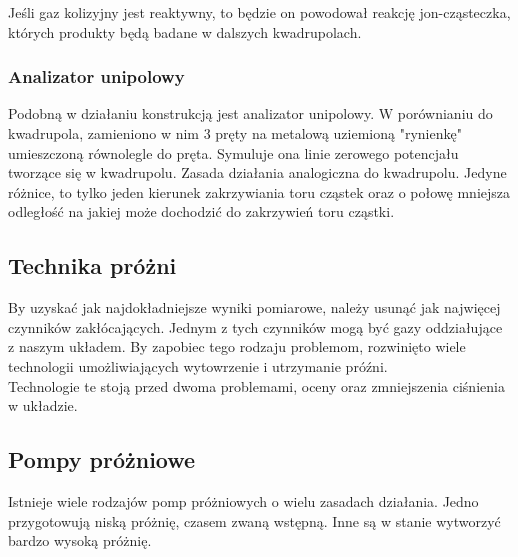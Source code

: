 \documentclass[paper=a4, fontsize=12pt]{scrartcl}
\begin{document}
Jeśli gaz kolizyjny jest reaktywny, to będzie on powodował reakcję jon-cząsteczka, których produkty będą badane w dalszych kwadrupolach.
\subsubsection{Analizator unipolowy}
Podobną w działaniu konstrukcją jest analizator unipolowy. W porównianiu do kwadrupola, zamieniono w nim 3 pręty na metalową uziemioną "rynienkę" umieszczoną równolegle do pręta. Symuluje ona linie zerowego potencjału tworzące się w kwadrupolu. Zasada działania analogiczna do kwadrupolu. Jedyne różnice, to tylko jeden kierunek zakrzywiania toru cząstek oraz o połowę mniejsza odległość na jakiej może dochodzić do zakrzywień toru cząstki.
\subsection{Technika próżni}
By uzyskać jak najdokładniejsze wyniki pomiarowe, należy usunąć jak najwięcej czynników zakłócających. Jednym z tych czynników mogą być gazy oddziałujące z naszym układem. By zapobiec tego rodzaju problemom, rozwinięto wiele technologii umożliwiających wytowrzenie i utrzymanie próźni.\\
Technologie te stoją przed dwoma problemami, oceny oraz zmniejszenia ciśnienia w układzie.

\subsection{Pompy próżniowe}
Istnieje wiele rodzajów pomp próżniowych o wielu zasadach działania. Jedno przygotowują niską próżnię, czasem zwaną wstępną. Inne są w stanie wytworzyć bardzo wysoką próżnię.
\end{document}
